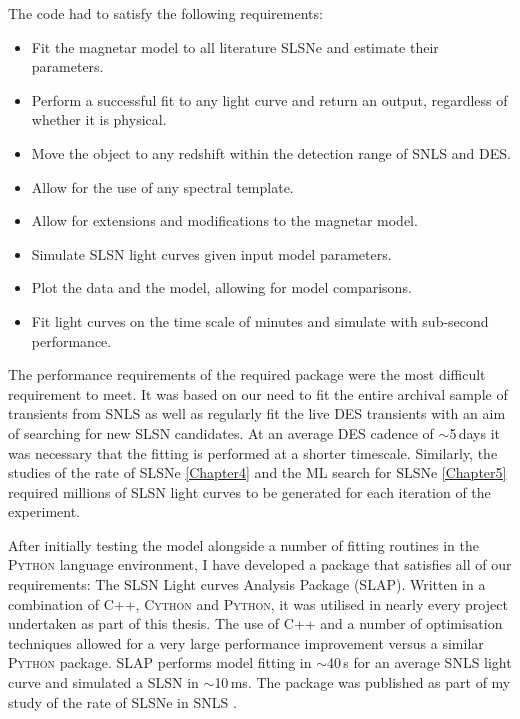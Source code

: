 The code had to satisfy the following requirements:
\begin{itemize}
  \item Fit the magnetar model to all literature SLSNe and estimate their parameters.
  \item Perform a successful fit to any light curve and return an output, regardless of whether it is physical.
  \item Move the object to any redshift within the detection range of SNLS and DES.
  \item Allow for the use of any spectral template.
  \item Allow for extensions and modifications to the magnetar model.
  \item Simulate SLSN light curves given input model parameters.
  \item Plot the data and the model, allowing for model comparisons.
  \item Fit light curves on the time scale of minutes and simulate with sub-second performance.
\end{itemize}

The performance requirements of the required package were the most difficult requirement to meet. It was based on our need to fit the entire archival sample of transients from SNLS as well as regularly fit the live DES transients with an aim of searching for new SLSN candidates. At an average DES cadence of $\sim$5\,days it was necessary that the fitting is performed at a shorter timescale. Similarly, the studies of the rate of SLSNe \cref{Chapter4} and the ML search for SLSNe \cref{Chapter5} required millions of SLSN light curves to be generated for each iteration of the experiment.

After initially testing the model alongside a number of fitting routines in the \textsc{Python} language environment, I have developed a package that satisfies all of our requirements: The SLSN Light curves Analysis Package (SLAP). Written in a combination of \textsc{C++}, \textsc{Cython} and \textsc{Python}, it was utilised in nearly every project undertaken as part of this thesis. The use of C++ and a number of optimisation techniques allowed for a very large performance improvement versus a similar \textsc{Python} package. \textsc{SLAP} performs model fitting in $\sim$40\,s for an average SNLS light curve and simulated a SLSN in $\sim$10\,ms. The package was published as part of my study of the rate of SLSNe in SNLS \citep{Prajs2016}.

